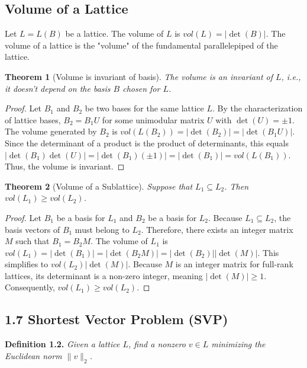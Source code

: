 \documentclass[12pt, a4paper]{article}
\theoremstyle{definition}
\theoremstyle{plain}
\newtheorem{theorem}{Theorem}[section]
\begin{document}
\subsection{Volume of a Lattice}
Let $L=L(B)$ be a lattice. The volume of $L$ is $vol(L)=|\det(B)|$. The volume of a lattice is the "volume" of the fundamental parallelepiped of the lattice.

\begin{theorem}[Volume is invariant of basis]
The volume is an invariant of $L$, i.e., it doesn't depend on the basis $B$ chosen for $L$.
\end{theorem}
\begin{proof}
Let $B_{1}$ and $B_{2}$ be two bases for the same lattice $L$. By the characterization of lattice bases, $B_{2}=B_{1}U$ for some unimodular matrix $U$ with $\det(U)=\pm1$. The volume generated by $B_{2}$ is $vol(L(B_{2})) = |\det(B_{2})| = |\det(B_{1}U)|$. Since the determinant of a product is the product of determinants, this equals $|\det(B_{1})\det(U)| = |\det(B_{1})(\pm1)| = |\det(B_{1})| = vol(L(B_{1}))$. Thus, the volume is invariant.
\end{proof}

\begin{theorem}[Volume of a Sublattice]
Suppose that $L_{1}\subseteq L_{2}$. Then $vol(L_{1})\ge vol(L_{2})$.
\end{theorem}
\begin{proof}
Let $B_{1}$ be a basis for $L_{1}$ and $B_{2}$ be a basis for $L_{2}$. Because $L_{1}\subseteq L_{2}$, the basis vectors of $B_{1}$ must belong to $L_{2}$. Therefore, there exists an integer matrix $M$ such that $B_{1}=B_{2}M$. The volume of $L_{1}$ is $vol(L_{1}) = |\det(B_{1})| = |\det(B_{2}M)| = |\det(B_{2})||\det(M)|$. This simplifies to $vol(L_{2})|\det(M)|$. Because $M$ is an integer matrix for full-rank lattices, its determinant is a non-zero integer, meaning $|\det(M)| \ge 1$. Consequently, $vol(L_{1}) \ge vol(L_{2})$.
\end{proof}

\vspace{0.5cm}

\subsection*{1.7 \quad Shortest Vector Problem (SVP)}

\noindent \textbf{Definition 1.2.} \textit{Given a lattice $L$, find a nonzero $v \in L$ minimizing the Euclidean norm $\|v\|_2$.}
\end{document}
